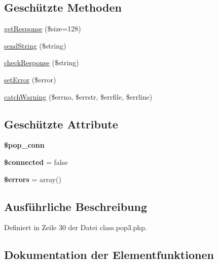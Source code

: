 \subsection*{Geschützte Methoden}
\begin{DoxyCompactItemize}
\item 
\mbox{\hyperlink{class_p_o_p3_a7d7291e693037a6a8cbb322adf1ff7dd}{get\+Response}} (\$size=128)
\item 
\mbox{\hyperlink{class_p_o_p3_a32a26f6d83f635a66622e95fca32a5de}{send\+String}} (\$string)
\item 
\mbox{\hyperlink{class_p_o_p3_ac68234fa176dda26c23733af44ef1c55}{check\+Response}} (\$string)
\item 
\mbox{\hyperlink{class_p_o_p3_abf17a9af3cbdf988738dfb894efd0c8a}{set\+Error}} (\$error)
\item 
\mbox{\hyperlink{class_p_o_p3_a211eb6b89572512b35a7c3984288627f}{catch\+Warning}} (\$errno, \$errstr, \$errfile, \$errline)
\end{DoxyCompactItemize}
\subsection*{Geschützte Attribute}
\begin{DoxyCompactItemize}
\item 
\mbox{\label{class_p_o_p3_a29ed46d6bff50732f5f38f9e3038ff52}} 
{\bfseries \$pop\+\_\+conn}
\item 
\mbox{\label{class_p_o_p3_a8095822fda20d2f1019a3e2c093c7b4e}} 
{\bfseries \$connected} = false
\item 
\mbox{\label{class_p_o_p3_a2ccc237d4b613d635e0fbc02502c6323}} 
{\bfseries \$errors} = array()
\end{DoxyCompactItemize}


\subsection{Ausführliche Beschreibung}


Definiert in Zeile 30 der Datei class.\+pop3.\+php.



\subsection{Dokumentation der Elementfunktionen}
\mbox{\label{class_p_o_p3_ae80dba3738dd402631b4565259fff42e}} 

